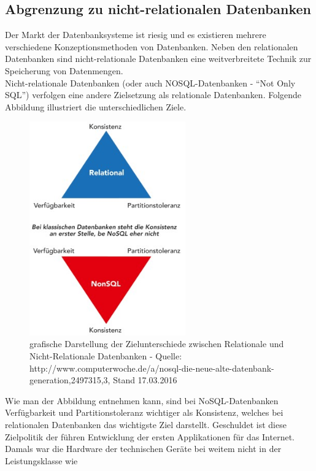 \documentclass[11pt]{article}
\begin{document}
\begin{onehalfspacing}
\subsection{Abgrenzung zu nicht-relationalen Datenbanken}
Der Markt der Datenbanksysteme ist riesig und es existieren mehrere verschiedene
Konzeptionsmethoden von Datenbanken. Neben den relationalen Datenbanken sind
nicht-relationale Datenbanken eine weitverbreitete Technik zur Speicherung von
Datenmengen. \\

Nicht-relationale Datenbanken (oder auch NOSQL-Datenbanken - "`Not Only SQL"')
verfolgen eine andere Zielsetzung als relationale Datenbanken. Folgende
Abbildung illustriert die unterschiedlichen Ziele.
\begin{figure}[H]
\centering\includegraphics[width=0.6\textwidth]{NoSQL.jpg}
\caption[Zielunterschiede Relationale vs. Nicht-Relationale
Datenbanken]{grafische Darstellung der Zielunterschiede zwischen Relationale und
Nicht-Relationale Datenbanken - Quelle:
http://www.computerwoche.de/a/nosql-die-neue-alte-datenbank-generation,2497315,3,
Stand 17.03.2016}
\end{figure}
Wie man der Abbildung entnehmen kann, sind bei NoSQL-Datenbanken Verfügbarkeit
und Partitionstoleranz wichtiger als Konsistenz, welches bei relationalen
Datenbanken das wichtigste Ziel darstellt. Geschuldet ist diese Zielpolitik der
führen Entwicklung der ersten Applikationen für das Internet. Damals war die
Hardware der technischen Geräte bei weitem nicht in der Leistungsklasse wie

\end{onehalfspacing}
\end{document}
